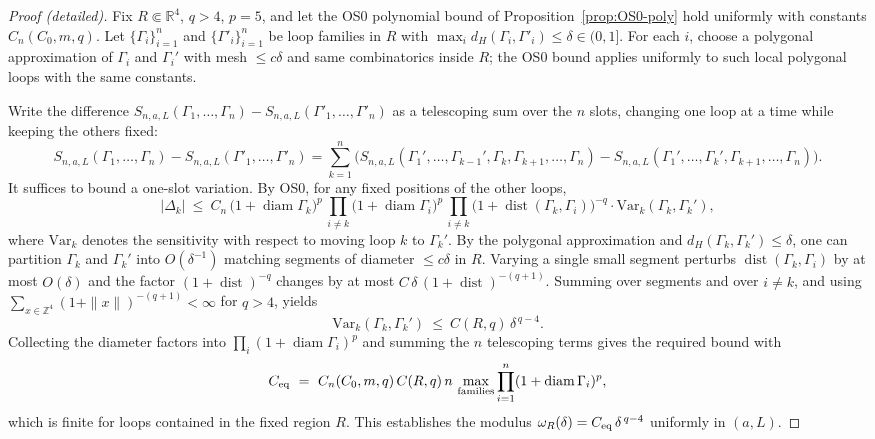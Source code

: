 \documentclass[11pt]{amsart}
\theoremstyle{plain}
\theoremstyle{definition}
\theoremstyle{remark}
\begin{document}
\begin{proof}[Proof (detailed)]
Fix $R\Subset\mathbb R^4$, $q>4$, $p=5$, and let the OS0 polynomial bound of Proposition~\ref{prop:OS0-poly} hold uniformly with constants $C_n(C_0,m,q)$. Let $\{\Gamma_i\}_{i=1}^n$ and $\{\Gamma'_i\}_{i=1}^n$ be loop families in $R$ with $\max_i d_H(\Gamma_i,\Gamma'_i)\le \delta\in(0,1]$. For each $i$, choose a polygonal approximation of $\Gamma_i$ and $\Gamma_i'$ with mesh $\le c\delta$ and same combinatorics inside $R$; the OS0 bound applies uniformly to such local polygonal loops with the same constants.

Write the difference $S_{n,a,L}(\Gamma_1,\dots,\Gamma_n)-S_{n,a,L}(\Gamma'_1,\dots,\Gamma'_n)$ as a telescoping sum over the $n$ slots, changing one loop at a time while keeping the others fixed:
\[
  S_{n,a,L}(\Gamma_1,\dots,\Gamma_n)-S_{n,a,L}(\Gamma'_1,\dots,\Gamma'_n)
   =\sum_{k=1}^n \big( S_{n,a,L}(\Gamma_1',\dots,\Gamma_{k-1}',\Gamma_k,\Gamma_{k+1},\dots,\Gamma_n)
   - S_{n,a,L}(\Gamma_1',\dots,\Gamma_{k}',\Gamma_{k+1},\dots,\Gamma_n)\big).
\]
It suffices to bound a one-slot variation. By OS0, for any fixed positions of the other loops,
\[
  \big|\Delta_k\big|\ \le\ C_n\,\big(1+\operatorname{diam}\Gamma_k\big)^p\,\prod_{i\ne k}\big(1+\operatorname{diam}\Gamma_i\big)^p\,\prod_{i\ne k}\big(1+\operatorname{dist}(\Gamma_k,\Gamma_i)\big)^{-q}
   \cdot \mathrm{Var}_k(\Gamma_k,\Gamma_k'),
\]
where $\mathrm{Var}_k$ denotes the sensitivity with respect to moving loop $k$ to $\Gamma_k'$. By the polygonal approximation and $d_H(\Gamma_k,\Gamma_k')\le \delta$, one can partition $\Gamma_k$ and $\Gamma_k'$ into $O(\delta^{-1})$ matching segments of diameter $\le c\delta$ in $R$. Varying a single small segment perturbs $\operatorname{dist}(\Gamma_k,\Gamma_i)$ by at most $O(\delta)$ and the factor $(1+\operatorname{dist})^{-q}$ changes by at most $C\,\delta\,(1+\operatorname{dist})^{-(q+1)}$. Summing over segments and over $i\ne k$, and using $\sum_{x\in \mathbb Z^4}(1+\|x\|)^{-(q+1)}<\infty$ for $q>4$, yields
\[
  \mathrm{Var}_k(\Gamma_k,\Gamma_k')\ \le\ C(R,q)\,\delta^{\,q-4}.
\]
Collecting the diameter factors into $\prod_i (1+\operatorname{diam}\Gamma_i)^p$ and summing the $n$ telescoping terms gives the required bound with
\[
  C_{\rm eq}\ =\ C_n(C_0,m,q)\,C(R,q)\,n\,\max_{\text{families}}\prod_{i=1}^n (1+\operatorname{diam}\Gamma_i)^p,
\]
which is finite for loops contained in the fixed region $R$. This establishes the modulus $\omega_R(\delta)=C_{\rm eq}\,\delta^{\,q-4}$ uniformly in $(a,L)$.
\end{proof}
\end{document}
